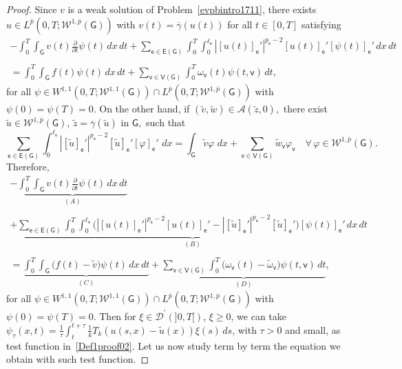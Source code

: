 \documentclass[reqno,12pt]{amsart}
\def\e{\mathsf{e}} 	%
\def\v{\mathsf{v}}	%
\newcommand{\G}{\mathsf{G}}	%
\newcommand{\V}{\mathsf{V}}	%
\newcommand{\E}{\mathsf{E}}	%
\numberwithin{equation}{section} %
\begin{document}
\begin{proof}
Since  $v$ is a weak solution of Problem~\eqref{evpbintro1711}, there exists $u \in L^{\overline{p}}(0,T;  \mathcal{W}^{1,\overline{p}}(\G))$ with $v(t) = \overline{\gamma}(u(t))$ for all $t \in [0,T]$ satisfying 
\begin{equation}\label{Def1proof01} \begin{array}{c} - \displaystyle\int_0^T \int_\G v(t) \frac{\partial}{\partial t} \psi(t)\,dx\, dt +  \sum_{\e \in\E(\G)}\int_0^T  \int_{0}^{\ell_\e}|[u(t)]_\e'|^{p_\e-2}[u(t)]_\e' [\psi(t)]_\e'  \,dx\, dt \\ \\
 \displaystyle = \int_0^T \int_{\G} f(t) \psi(t)\,dx\, dt+\sum_{\v\in \V(\G)}\int_0^T\omega_\v(t)\psi(t,\v) \, dt, \end{array}
\end{equation}
for all $\psi \in W^{1,1}(0,T; \mathcal{W}^{1,1}(\G)) \cap L^{\overline{p}}(0,T; \mathcal{W}^{1,\overline{p}}(\G))$ with $\psi(0) = \psi (T) =0$.
On the other hand, if $(\tilde{v},\tilde{w}) \in \mathcal{A}(\tilde{z}, 0),$ there exist $\tilde{u} \in \mathcal{W}^{1,\overline{p}}(\G)$, $ \tilde z = \overline{\gamma}(\tilde{u})$ in  $\G,$
such that
\begin{equation}\label{Weak1rep01N} \sum_{\e \in\E(\G)}\int_{0}^{\ell_\e}|[\tilde{u}]_\e'|^{p_\e-2}[\tilde{u}]_\e' [\varphi]_\e' \, \,dx  = \int_\G  \widetilde v \varphi \, \,dx +   \sum_{\v\in \V(\G)} \tilde{w}_\v\varphi_\v\quad \forall \, \varphi \in \mathcal{W}^{1,\overline{p}}(\G). \end{equation}
 Therefore,
\begin{equation}\label{Def1proof02} \begin{array}{c}   \displaystyle - \underbrace{\int_0^T \int_\G v(t) \frac{\partial}{\partial t} \psi(t)\,dx\, dt}_{(A)} \\ \\
\displaystyle
+  \underbrace{\sum_{\e \in\E(\G)}\int_0^T  \int_{0}^{\ell_\e}\Big(|[u(t)]_\e'|^{p_\e-2}[u(t)]_\e'-|[\tilde{u}]_\e'|^{p_\e-2}[\tilde{u}]_\e'   \Big)[\psi(t)]_\e'  \,dx\, dt}_{(B)} \\ \\
 \displaystyle = \underbrace{\int_0^T \int_{\G} \big(f(t)-\tilde v\big) \psi(t)\,dx\, dt}_{(C)}+\underbrace{\sum_{\v\in \V(\G)}\int_0^T\big(\omega_\v(t)-\tilde \omega_\v)\psi(t,\v) \, dt}_{(D)}, \end{array}
\end{equation}
for all $\psi \in W^{1,1}(0,T; \mathcal{W}^{1,1}(\G)) \cap L^{\overline{p}}(0,T; \mathcal{W}^{1,\overline{p}}(\G))$ with $\psi(0) = \psi (T) =0$.
Then for $\xi\in  \mathcal{D}^{\prime}(]0,T[)$, $\xi\ge 0$, we can take $\displaystyle\psi_\tau(x,t)=\frac{1}{\tau}\int_t^{t+\tau}\frac{1}{k}T_k(u(s,x)-\tilde u(x))\xi(s)\, ds$,
with  $\tau>0 $  and small, as test function in~\eqref{Def1proof02}.
Let us now study term by term the  equation we obtain with such test function. 



\end{proof}
\end{document}
